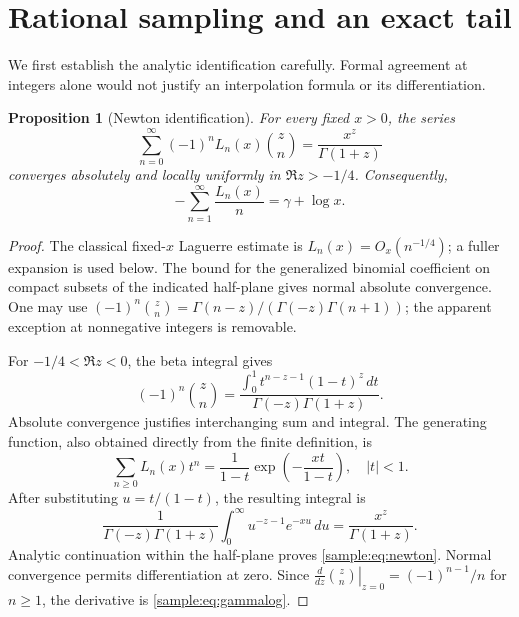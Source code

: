 \documentclass[11pt,a4paper]{article}
\newtheorem{proposition}[theorem]{Proposition}
\theoremstyle{definition}
\theoremstyle{remark}
\numberwithin{equation}{section}
\begin{document}
\section{Rational sampling and an exact tail}
\label{sample:sec:sampling}
We first establish the analytic identification carefully. Formal
agreement at integers alone would not justify an interpolation formula
or its differentiation.

\begin{proposition}[Newton identification]\label{sample:prop:newton}
For every fixed $x>0$, the series
\begin{equation}\label{sample:eq:newton}
\sum_{n=0}^{\infty}(-1)^nL_n(x)\binom zn
=\frac{x^z}{\Gamma(1+z)}
\end{equation}
converges absolutely and locally uniformly in $\Re z>-1/4$.
Consequently,
\begin{equation}\label{sample:eq:gammalog}
-\sum_{n=1}^{\infty}\frac{L_n(x)}n=\gamma+\log x.
\end{equation}
\end{proposition}
\begin{proof}
The classical fixed-$x$ Laguerre estimate is
$L_n(x)=O_x(n^{-1/4})$; a fuller expansion is used below.
The bound for the generalized binomial coefficient on compact subsets
of the indicated half-plane gives normal absolute convergence.
One may use
$(-1)^n\binom zn=\Gamma(n-z)/(\Gamma(-z)\Gamma(n+1))$;
the apparent exception at nonnegative integers is removable.

For $-1/4<\Re z<0$, the beta integral gives
\[
(-1)^n\binom zn=
\frac{\int_0^1t^{n-z-1}(1-t)^z\,dt}
{\Gamma(-z)\Gamma(1+z)}.
\]
Absolute convergence justifies interchanging sum and integral. The
generating function, also obtained directly from the finite definition,
is
\begin{equation}\label{sample:eq:LagGF}
\sum_{n\ge0}L_n(x)t^n=
\frac1{1-t}\exp\left(-\frac{xt}{1-t}\right),\quad |t|<1.
\end{equation}
After substituting $u=t/(1-t)$, the resulting integral is
\[
\frac1{\Gamma(-z)\Gamma(1+z)}
\int_0^\infty u^{-z-1}e^{-xu}\,du
=\frac{x^z}{\Gamma(1+z)}.
\]
Analytic continuation within the half-plane proves
\eqref{sample:eq:newton}. Normal convergence permits differentiation at zero.
Since $\left.\frac{d}{dz}\binom zn\right|_{z=0}=(-1)^{n-1}/n$
for $n\ge1$, the derivative is \eqref{sample:eq:gammalog}.
\end{proof}
\end{document}
